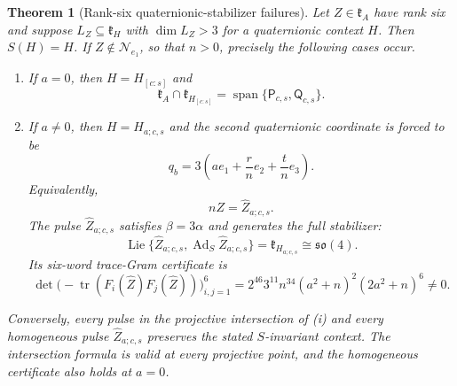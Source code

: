 \documentclass[11pt,a4paper]{article}
\newtheorem{theorem}{Theorem}[section]
\newcommand{\Lie}{\operatorname{Lie}}
\newcommand{\Ad}{\operatorname{Ad}}
\newcommand{\Span}{\operatorname{span}}
\begin{document}
\begin{theorem}[Rank-six quaternionic-stabilizer failures]
\label{thm:visible-contexts}
Let $Z\in\mathfrak k_A$ have rank six and suppose
$L_Z\subseteq\mathfrak k_H$ with $\dim L_Z>3$ for a quaternionic context $H$.
Then $S(H)=H$.  If $Z\notin\mathcal N_{e_1}$, so that $n>0$, precisely the following cases occur.
\begin{enumerate}[label=\textnormal{(\roman*)},leftmargin=9mm]
\item If $a=0$, then $H=H_{[c:s]}$ and
\[
\mathfrak k_A\cap\mathfrak k_{H_{[c:s]}}
 =\Span\{\mathsf P_{c,s},\mathsf Q_{c,s}\}.
\]
\item If $a\ne0$, then $H=H_{a;c,s}$ and the second quaternionic coordinate is forced to be
\begin{equation}
q_b=3\left(ae_1+\frac r n e_2+\frac t n e_3\right).
\label{eq:resonant-qb}
\end{equation}
Equivalently,
\begin{equation}
nZ=\widehat Z_{a;c,s}.
\label{eq:resonant-pulse}
\end{equation}
The pulse $\widehat Z_{a;c,s}$ satisfies $\beta=3\alpha$ and generates the full stabilizer:
\[
\Lie\{\widehat Z_{a;c,s},\Ad_S\widehat Z_{a;c,s}\}
 =\mathfrak k_{H_{a;c,s}}\cong\mathfrak{so}(4).
\]
Its six-word trace-Gram certificate is
\begin{equation}
\det\bigl(-\operatorname{tr}(F_i(\widehat Z)F_j(\widehat Z))\bigr)_{i,j=1}^{6}
 =2^{46}3^{11}n^{34}(a^2+n)^2(2a^2+n)^6\ne0.
\label{eq:resonant-so4-gram}
\end{equation}
\end{enumerate}
Conversely, every pulse in the projective intersection of (i) and every homogeneous pulse
$\widehat Z_{a;c,s}$ preserves the stated $S$-invariant context.
The intersection formula is valid at every projective point, and the homogeneous certificate
also holds at $a=0$.
\end{theorem}
\end{document}
